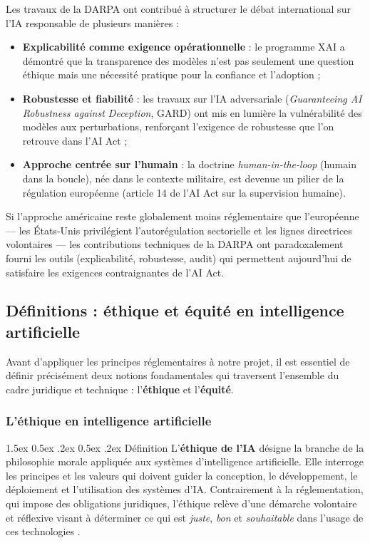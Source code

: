 \documentclass[12pt,a4paper]{article}
\makeatletter
\renewcommand\paragraph{\@startsection{paragraph}{4}{\z@}%
  {1.5ex \@plus 0.5ex \@minus .2ex}%
  {0.5ex \@plus .2ex}%
  {\normalfont\normalsize\bfseries}}
\makeatother
\begin{document}
Les travaux de la DARPA ont contribué à structurer le débat international sur l'IA responsable de plusieurs manières :
\begin{itemize}
    \item \textbf{Explicabilité comme exigence opérationnelle} : le programme XAI a démontré que la transparence des modèles n'est pas seulement une question éthique mais une nécessité pratique pour la confiance et l'adoption ;
    \item \textbf{Robustesse et fiabilité} : les travaux sur l'IA adversariale (\textit{Guaranteeing AI Robustness against Deception}, GARD) ont mis en lumière la vulnérabilité des modèles aux perturbations, renforçant l'exigence de robustesse que l'on retrouve dans l'AI Act ;
    \item \textbf{Approche centrée sur l'humain} : la doctrine \textit{human-in-the-loop} (humain dans la boucle), née dans le contexte militaire, est devenue un pilier de la régulation européenne (article 14 de l'AI Act sur la supervision humaine).
\end{itemize}

Si l'approche américaine reste globalement moins réglementaire que l'européenne --- les États-Unis privilégient l'autorégulation sectorielle et les lignes directrices volontaires --- les contributions techniques de la DARPA ont paradoxalement fourni les outils (explicabilité, robustesse, audit) qui permettent aujourd'hui de satisfaire les exigences contraignantes de l'AI Act.

\subsection{Définitions : éthique et équité en intelligence artificielle}

Avant d'appliquer les principes réglementaires à notre projet, il est essentiel de définir précisément deux notions fondamentales qui traversent l'ensemble du cadre juridique et technique : l'\textbf{éthique} et l'\textbf{équité}.

\subsubsection{L'éthique en intelligence artificielle}

\paragraph{Définition}
L'\textbf{éthique de l'IA} désigne la branche de la philosophie morale appliquée aux systèmes d'intelligence artificielle. Elle interroge les principes et les valeurs qui doivent guider la conception, le développement, le déploiement et l'utilisation des systèmes d'IA. Contrairement à la réglementation, qui impose des obligations juridiques, l'éthique relève d'une démarche volontaire et réflexive visant à déterminer ce qui est \textit{juste}, \textit{bon} et \textit{souhaitable} dans l'usage de ces technologies \cite{cnil_ethique}.
\end{document}
